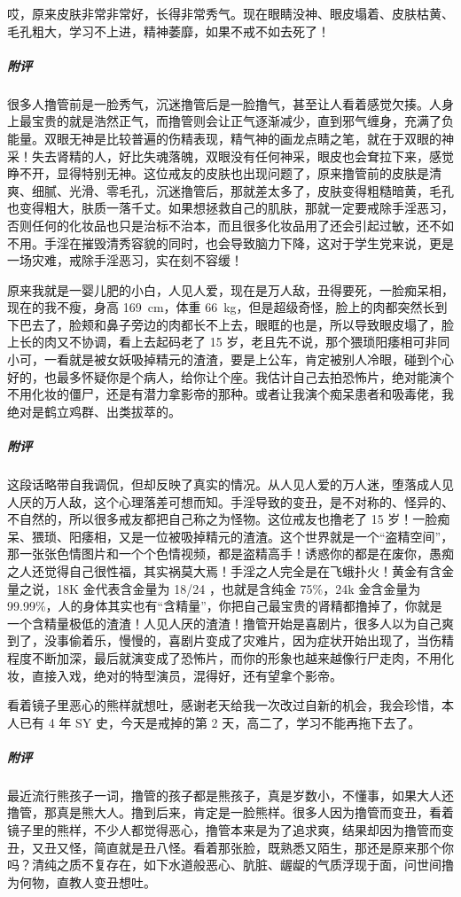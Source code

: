 \begin{case}[变丑]
    哎，原来皮肤非常非常好，长得非常秀气。现在眼睛没神、眼皮塌着、皮肤枯黄、毛孔粗大，学习不上进，精神萎靡，如果不戒不如去死了！
    \subparagraph{附评} 很多人撸管前是一脸秀气，沉迷撸管后是一脸撸气，甚至让人看着感觉欠揍。人身上最宝贵的就是浩然正气，而撸管则会让正气逐渐减少，直到邪气缠身，充满了负能量。双眼无神是比较普遍的伤精表现，精气神的画龙点睛之笔，就在于双眼的神采！失去肾精的人，好比失魂落魄，双眼没有任何神采，眼皮也会耷拉下来，感觉睁不开，显得特别无神。这位戒友的皮肤也出现问题了，原来撸管前的皮肤是清爽、细腻、光滑、零毛孔，沉迷撸管后，那就差太多了，皮肤变得粗糙暗黄，毛孔也变得粗大，肤质一落千丈。如果想拯救自己的肌肤，那就一定要戒除手淫恶习，否则任何的化妆品也只是治标不治本，而且很多化妆品用了还会引起过敏，还不如不用。手淫在摧毁清秀容貌的同时，也会导致脑力下降，这对于学生党来说，更是一场灾难，戒除手淫恶习，实在刻不容缓！
\end{case}

\begin{case}[变丑]
    原来我就是一婴儿肥的小白，人见人爱，现在是万人敌，丑得要死，一脸痴呆相，现在的我不瘦，身高 \SI{169}{\centi\metre}，体重 \SI{66}{\kilo\gram}，但是超级奇怪，脸上的肉都突然长到下巴去了，脸颊和鼻子旁边的肉都长不上去，眼眶的也是，所以导致眼皮塌了，脸上长的肉又不协调，看上去起码老了 15 岁，老且先不说，那个猥琐阳痿相可非同小可，一看就是被女妖吸掉精元的渣渣，要是上公车，肯定被别人冷眼，碰到个心好的，也最多怀疑你是个病人，给你让个座。我估计自己去拍恐怖片，绝对能演个不用化妆的僵尸，还是有潜力拿影帝的那种。或者让我演个痴呆患者和吸毒佬，我绝对是鹤立鸡群、出类拔萃的。
    \subparagraph{附评} 这段话略带自我调侃，但却反映了真实的情况。从人见人爱的万人迷，堕落成人见人厌的万人敌，这个心理落差可想而知。手淫导致的变丑，是不对称的、怪异的、不自然的，所以很多戒友都把自己称之为怪物。这位戒友也撸老了 15 岁！一脸痴呆、猥琐、阳痿相，又是一位被吸掉精元的渣渣。这个世界就是一个“盗精空间”，那一张张色情图片和一个个色情视频，都是盗精高手！诱惑你的都是在废你，愚痴之人还觉得自己很性福，其实祸莫大焉！手淫之人完全是在飞蛾扑火！黄金有含金量之说，18K 金代表含金量为 18/24 ，也就是含纯金 75\%，24k 金含金量为 99.99\%，人的身体其实也有“含精量”，你把自己最宝贵的肾精都撸掉了，你就是一个含精量极低的渣渣！人见人厌的渣渣！撸管开始是喜剧片，很多人以为自己爽到了，没事偷着乐，慢慢的，喜剧片变成了灾难片，因为症状开始出现了，当伤精程度不断加深，最后就演变成了恐怖片，而你的形象也越来越像行尸走肉，不用化妆，直接入戏，绝对的特型演员，混得好，还有望拿个影帝。
\end{case}

\begin{case}[变丑]
    看着镜子里恶心的熊样就想吐，感谢老天给我一次改过自新的机会，我会珍惜，本人已有 4 年 SY 史，今天是戒掉的第 2 天，高二了，学习不能再拖下去了。
    \subparagraph{附评} 最近流行熊孩子一词，撸管的孩子都是熊孩子，真是岁数小，不懂事，如果大人还撸管，那真是熊大人。撸到后来，肯定是一脸熊样。很多人因为撸管而变丑，看着镜子里的熊样，不少人都觉得恶心，撸管本来是为了追求爽，结果却因为撸管而变丑，又丑又怪，简直就是丑八怪。看着那张脸，既熟悉又陌生，那还是原来那个你吗？清纯之质不复存在，如下水道般恶心、肮脏、龌龊的气质浮现于面，问世间撸为何物，直教人变丑想吐。
\end{case}

